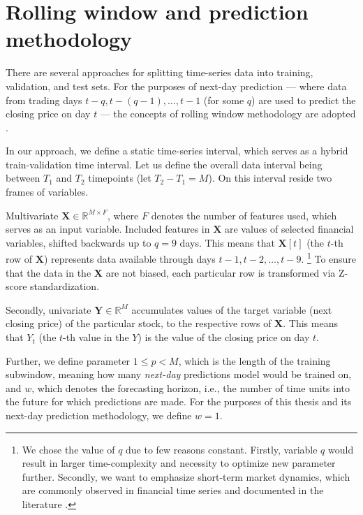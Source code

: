 \section{Rolling window and prediction methodology}
\label{rolling}
There are several approaches for splitting time-series data into training, validation, and test sets. For the purposes of next-day prediction — where data from trading days $t-q, t-(q-1), \dots, t-1$ 
(for some $q$) are used to predict the closing price on day $t$ — the concepts of rolling window methodology are adopted \cite{forecast_book}.
\par
In our approach, we define a static time-series interval, which serves as a hybrid train-validation time interval. Let us define the overall data interval being between
$T_1$ and $T_2$ timepoints (let $T_2-T_1=M$). On this interval reside two frames of variables. 

Multivariate $\mathbf{X} \in \mathbb{R}^{M \times F}$, where $F$ denotes the number of features used, which serves 
as an input variable. Included features in $\mathbf{X}$ are values of selected financial variables, shifted backwards up to $q=9$ days. This means that 
$\mathbf{X}[t]$ (the $t$-th row of $\mathbf{X}$) represents data available through days $t-1, t-2, \ldots, t-9$. \footnote{We chose the value of $q$ due to few reasons constant. Firstly, variable $q$ 
would result in larger time-complexity and necessity to optimize new parameter further. Secondly, we want to emphasize short-term market dynamics,
which are commonly observed in financial time series and documented in the literature \cite{forecast_book}.} To ensure that the data in the $\mathbf{X}$ are not biased, each particular row is transformed via Z-score standardization.

Secondly, univariate $\mathbf{Y} \in \mathbb{R}^M$ accumulates values of the target variable (next closing price) of the particular stock, to the respective rows of $\mathbf{X}$. This means that $Y_t$ (the $t$-th value in the $Y$) is the value of the closing price on day $t$.
\par
Further, we define parameter $1 \leq p<M$, which is the length of the training subwindow, meaning how many \textit{next-day} predictions model would be trained on,
and $w$, which denotes the forecasting horizon, i.e., the number of time units into the future for which predictions are made. For the purposes of this thesis and its next-day prediction methodology, we define $w=1$.

